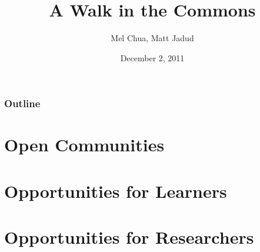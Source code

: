 \documentclass{beamer}
\title{A Walk in the Commons}
\author{Mel Chua, Matt Jadud}
\date{December 2, 2011}
\begin{document}
\titlepage

\begin{frame} 
\frametitle{Outline}
\tableofcontents
\end{frame} 

\section{Open Communities}
\begin{comment}
* What is open / what are open communities?
** What's open source/content?
** some projects you may have heard of (Firefox, Wikipedia, etc)
** some you may not have (Wikiotics, CivX, FreeCiv, Civicommons, Sahana, CiviCRM)
** it's not just Linux - a lot of this stuff runs on other platforms too (Windows, Mac, web-based) "no, we are not trying to get you to reinstall your computer" (but if you're interested, we're happy to help)
** the Four Freedoms (made for software)
*** Freedom / friends / ?
** creative commons (made for content)
** it's more than licensing... what's "the open source way," some characteristics of those communities (realtime transparency, etc)
\end{comment}

\section{Opportunities for Learners}
\begin{comment}
* What can your students do?
** One example (pick one - Fedora & your first-year class)
** Documentation
** Translation
** Gardening
** Bug fixing
** Testing
** Artwork/design
** Marketing/outreach
** Being active and vocal users (use open source in outreach/service projects - for instance, Mo & the Girl Scouts) / advocacy
** Legal/licensing work (very, *very* basic stuff)
** it's the non-programming skills that are usually in most need by these communities, because nobody knows about them / how to do them, so you can almost become domain "experts" in a project
** Creative repurposing - bringing a project into a new domain it wasn't necessarily originally designed for
\end{comment}

\section{Opportunities for Researchers}
\begin{comment}
Researchers: they exist! (10 seconds each, no more.)
* coleman - ethics in foss communities
* krafft - innovation diffusion
* benkler - "law stuff"
* von hippel - economics
* lawler - wikiversity formation
* dennys and martin - semantic mediawiki
* davis and jabeen - legitimate peripheral participation
* government adoption paper whose author name I forgot
* Mini Case Study: CC licensed video in Zach's research
\end{comment}
\end{document}

